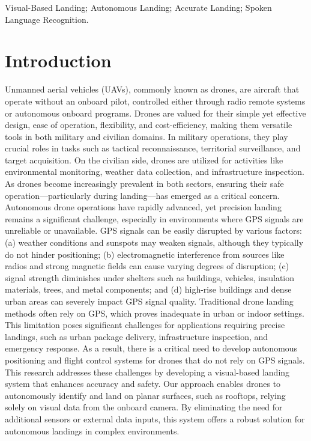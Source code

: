 \documentclass[3p,times]{elsarticle}
\begin{document}
\begin{frontmatter}
\begin{abstract}
\end{abstract}

\begin{keyword}
Visual-Based Landing; Autonomous Landing; Accurate Landing; Spoken Language Recognition.
\end{keyword}

\end{frontmatter}

\section{Introduction}
Unmanned aerial vehicles (UAVs), commonly known as drones, are aircraft that operate without an onboard pilot, controlled either through radio remote systems or autonomous onboard programs. Drones are valued for their simple yet effective design, ease of operation, flexibility, and cost-efficiency, making them versatile tools in both military and civilian domains. In military operations, they play crucial roles in tasks such as tactical reconnaissance, territorial surveillance, and target acquisition. On the civilian side, drones are utilized for activities like environmental monitoring, weather data collection, and infrastructure inspection. As drones become increasingly prevalent in both sectors, ensuring their safe operation—particularly during landing—has emerged as a critical concern.\\Autonomous drone operations have rapidly advanced, yet precision landing remains a significant challenge, especially in environments where GPS signals are unreliable or unavailable. GPS signals can be easily disrupted by various factors: (a) weather conditions and sunspots may weaken signals, although they typically do not hinder positioning; (b) electromagnetic interference from sources like radios and strong magnetic fields can cause varying degrees of disruption; (c) signal strength diminishes under shelters such as buildings, vehicles, insulation materials, trees, and metal components; and (d) high-rise buildings and dense urban areas can severely impact GPS signal quality. Traditional drone landing methods often rely on GPS, which proves inadequate in urban or indoor settings. This limitation poses significant challenges for applications requiring precise landings, such as urban package delivery, infrastructure inspection, and emergency response. As a result, there is a critical need to develop autonomous positioning and flight control systems for drones that do not rely on GPS signals.\\
This research addresses these challenges by developing a visual-based landing system that enhances accuracy and safety. Our approach enables drones to autonomously identify and land on planar surfaces, such as rooftops, relying solely on visual data from the onboard camera. By eliminating the need for additional sensors or external data inputs, this system offers a robust solution for autonomous landings in complex environments.
\end{document}
